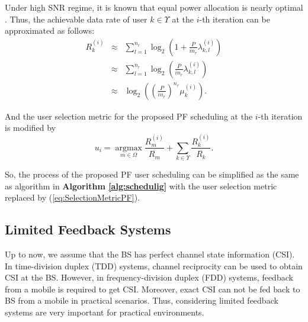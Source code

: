 \documentclass[journal,twoside]{IEEEtranTCOM}
\begin{document}
Under high SNR regime, it is known that equal power allocation is nearly optimal \cite{EqualPowerAllo}. Thus, the achievable data rate of user $k \in \Upsilon$ at the $i$-th iteration can be approximated as follows:
\begin{eqnarray} \label{eq:ApproxRatePrv}
R_k^{(i)} & \approx & \sum\limits_{l = 1}^{{n_r}} {{{\log }_2}\left( {1 + \frac{P}{{i{n_r}}}{\lambda}_{k,l}^{(i)}} \right)} \nonumber \\
& \approx & \sum\limits_{l = 1}^{{n_r}} {{{\log }_2}\left( {\frac{P}{{i{n_r}}}{\lambda}_{k,l}^{(i)}} \right)} \nonumber \\
& \approx & {{{\log }_2}\left( { {\left(\frac{P}{i{n_r}}\right)}^{n_r} {\mu_k^{(i)}}  } \right)}.
\end{eqnarray}

And the user selection metric for the proposed PF scheduling at the $i$-th iteration is modified  by
\begin{equation} \label{eq:SelectionMetricPF}
u_i = \mathop {\arg \max }\limits_{m \in \Omega } {\frac{{R}_m^{(i)}}{\overline{R_m}}} + \sum\limits_{k \in \Upsilon  } {\frac{R_k^{(i)}}{\overline{R_k}}}.
\end{equation}

So, the process of the proposed PF user scheduling can be simplified as the same as algorithm in \textbf{Algorithm \ref{alg:schedulig}} with the user selection metric replaced by (\ref{eq:SelectionMetricPF}).

\subsection{Limited Feedback Systems}
Up to now, we assume that the BS has perfect channel state information (CSI). In time-division duplex (TDD) systems, channel reciprocity can be used to obtain CSI at the BS. However, in frequency-division duplex (FDD) systems, feedback from a mobile is required to get CSI. Moreover, exact CSI can not be fed back to BS from a mobile in practical scenarios. Thus, considering limited feedback systems are very important for practical environments.
\end{document}
